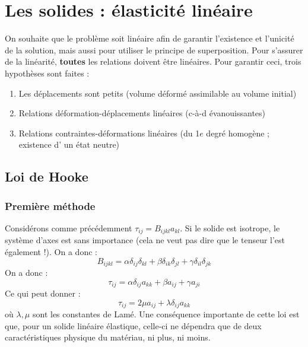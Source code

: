     
    
    
        
\section{Les solides : élasticité linéaire}
On souhaite que le problème soit linéaire afin de garantir l'existence et l'unicité de la
solution, mais aussi pour utiliser le principe de superposition. Pour s'assurer de la
linéarité, \textbf{toutes} les relations doivent être linéaires. Pour garantir ceci, trois
hypothèses sont faites :
\begin{enumerate}
	\item Les déplacements sont petits (volume déformé assimilable au volume initial)
	\item Relations déformation-déplacements linéaires (c-à-d évanouissantes)
	\item Relations contraintes-déformations linéaires (du 1$e$ degré homogène ; existence d'
	      un état neutre)
\end{enumerate}

\subsection{Loi de Hooke}
\subsubsection{Première méthode}
Considérons comme précédemment $\tau_{ij} = B_{ijkl}a_{kl}$. Si le solide est isotrope,
le système d'axes est sans importance (cela ne veut pas dire que le tenseur l'est 
également !). On a donc : 
\begin{equation}
	B_{ijkl} = \alpha \delta_{ij}\delta_{kl} + \beta\delta_{ik}\delta_{jl} +\gamma\delta_{il}
	\delta_{jk} 
\end{equation}
On a donc :
\begin{equation}
	\tau_{ij} = \alpha\delta_{ij}a_{kk} + \beta a_{ij} + \gamma a_{ji} 
\end{equation}
Ce qui peut donner :
\begin{equation}
	\tau_{ij} = 2\mu a_{ij} + \lambda \delta_{ij}a_{kk}
\end{equation}
où $\lambda,\mu$ sont les constantes de Lamé. Une conséquence importante de cette loi est
que, pour un solide linéaire élastique, celle-ci ne dépendra que de deux caractéristiques
physique du matériau, ni plus, ni moins.
    
    
